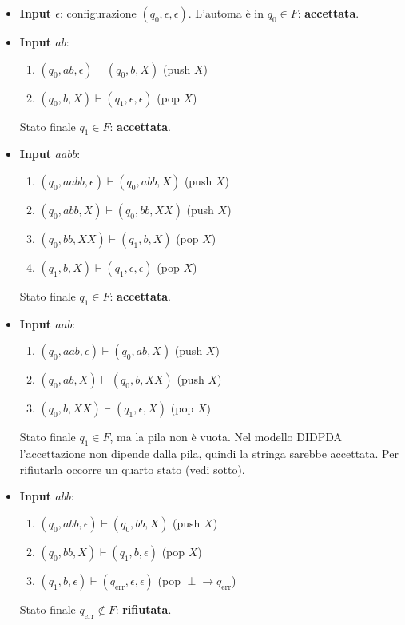 \documentclass[a4paper,12pt]{article}
\begin{document}
\begin{itemize}
    \item \textbf{Input $\epsilon$}: configurazione $(q_0, \epsilon, \epsilon)$. L'automa è in $q_0 \in F$: \textbf{accettata}.
    \item \textbf{Input $ab$}:
    \begin{enumerate}
        \item $(q_0, ab, \epsilon) \vdash (q_0, b, X)$ \quad (push $X$)
        \item $(q_0, b, X) \vdash (q_1, \epsilon, \epsilon)$ \quad (pop $X$)
    \end{enumerate}
    Stato finale $q_1 \in F$: \textbf{accettata}.

    \item \textbf{Input $aabb$}:
    \begin{enumerate}
        \item $(q_0, aabb, \epsilon) \vdash (q_0, abb, X)$ \quad (push $X$)
        \item $(q_0, abb, X) \vdash (q_0, bb, XX)$ \quad (push $X$)
        \item $(q_0, bb, XX) \vdash (q_1, b, X)$ \quad (pop $X$)
        \item $(q_1, b, X) \vdash (q_1, \epsilon, \epsilon)$ \quad (pop $X$)
    \end{enumerate}
    Stato finale $q_1 \in F$: \textbf{accettata}.

    \item \textbf{Input $aab$}:
    \begin{enumerate}
        \item $(q_0, aab, \epsilon) \vdash (q_0, ab, X)$ \quad (push $X$)
        \item $(q_0, ab, X) \vdash (q_0, b, XX)$ \quad (push $X$)
        \item $(q_0, b, XX) \vdash (q_1, \epsilon, X)$ \quad (pop $X$)
    \end{enumerate}
    Stato finale $q_1 \in F$, ma la pila non è vuota. Nel modello DIDPDA l'accettazione non dipende dalla pila, quindi la stringa sarebbe accettata. Per rifiutarla occorre un quarto stato (vedi sotto).

    \item \textbf{Input $abb$}:
    \begin{enumerate}
        \item $(q_0, abb, \epsilon) \vdash (q_0, bb, X)$ \quad (push $X$)
        \item $(q_0, bb, X) \vdash (q_1, b, \epsilon)$ \quad (pop $X$)
        \item $(q_1, b, \epsilon) \vdash (q_{\text{err}}, \epsilon, \epsilon)$ \quad (pop $\perp \to q_{\text{err}}$)
    \end{enumerate}
    Stato finale $q_{\text{err}} \notin F$: \textbf{rifiutata}.


\end{itemize}
\end{document}
